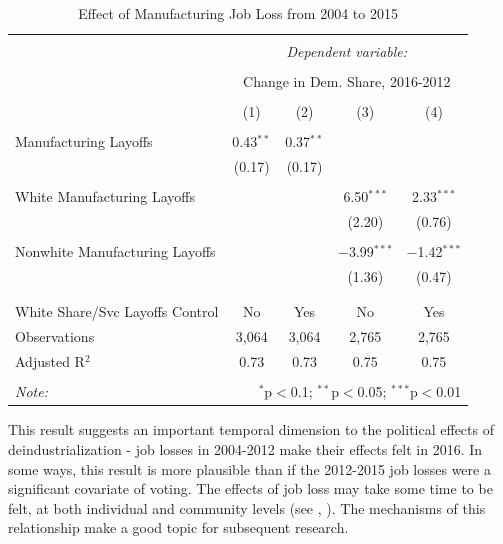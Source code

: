 \documentclass[]{AEA}
\begin{document}
\begin{table}[!htbp] \centering 
  \caption{Effect of Manufacturing Job Loss from 2004 to 2015} 
  \label{regResult12} 
\begin{tabular}{@{\extracolsep{5pt}}lcccc} 
\\[-1.8ex]\hline 
\hline \\[-1.8ex] 
 & \multicolumn{4}{c}{\textit{Dependent variable:}} \\ 
\cline{2-5} 
\\[-1.8ex] & \multicolumn{4}{c}{Change in Dem. Share, 2016-2012} \\ 
\\[-1.8ex] & (1) & (2) & (3) & (4)\\ 
\hline \\[-1.8ex] 
 Manufacturing Layoffs & 0.43$^{**}$ & 0.37$^{**}$ &  &  \\ 
  & (0.17) & (0.17) &  &  \\ 
  & & & & \\ 
 White Manufacturing Layoffs &  &  & 6.50$^{***}$ & 2.33$^{***}$ \\ 
  &  &  & (2.20) & (0.76) \\ 
  & & & & \\ 
 Nonwhite Manufacturing Layoffs &  &  & $-$3.99$^{***}$ & $-$1.42$^{***}$ \\ 
  &  &  & (1.36) & (0.47) \\ 
  & & & & \\ 
\hline \\[-1.8ex] 
White Share/Svc Layoffs Control & No & Yes & No & Yes \\ 
Observations & 3,064 & 3,064 & 2,765 & 2,765 \\ 
Adjusted R$^{2}$ & 0.73 & 0.73 & 0.75 & 0.75 \\ 
\hline 
\hline \\[-1.8ex] 
\textit{Note:}  & \multicolumn{4}{r}{$^{*}$p$<$0.1; $^{**}$p$<$0.05; $^{***}$p$<$0.01} \\ 
\end{tabular} 
\end{table} 
\FloatBarrier

This result suggests an important temporal dimension to the political
effects of deindustrialization - job losses in 2004-2012 make their
effects felt in 2016. In some ways, this result is more plausible than
if the 2012-2015 job losses were a significant covariate of voting. The
effects of job loss may take some time to be felt, at both individual
and community levels (see \cite{Mckee09}, \cite{Foote19}). The
mechanisms of this relationship make a good topic for subsequent
research.
\end{document}
